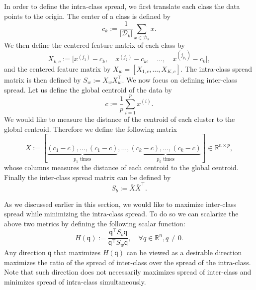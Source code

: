 \documentclass[11pt]{article}
\newcommand{\R}{\mathbb{R}}
\newcommand{\D}{\mathcal{D}}
\newcommand{\q}{\textsf{q}}
\begin{document}
In order to define the intra-class spread, we first translate each
class the data points to the origin. The center of a class is defined
by
\begin{equation}
  c_k := \frac{1}{|\D_k|} \sum_{x \in \D_k} x.
\end{equation}
We then define the centered feature matrix of each class by
\begin{equation}
  X_{k, c} := \Big[x^{(j_1)}-c_k, \quad x^{(j_2)}-c_k, \quad \dots,
    \quad x^{(j_{p_k})}-c_k \Big],
\end{equation}
and the centered feature matrix by $X_w = [X_{1, c}, \dots, X_{K,
    c}]$.  The intra-class spread matrix is then defined by $S_w :=
X_w^{} X_w^{\top}$. We now focus on defining inter-class spread. Let
us define the global centroid of the data by
\begin{equation}
	c := \frac{1}{p} \sum_{i=1}^{p} x^{(i)}.
\end{equation}
We would like to measure the distance of the centroid of each cluster
to the global centroid. Therefore we define the following matrix
\begin{equation}
	\bar{X} := [ \underbrace{(c_1 - c), \dots, (c_1 - c)}_{p_1
            \text{ times}}, \dots, \underbrace{(c_k - c), \dots, (c_k
            - c)}_{p_k \text{ times}}] \in \R^{n \times p},
\end{equation}
whose columns measures the distance of each centroid to the global
centroid. Finally the inter-class spread matrix can be defined by
\begin{equation}
	S_b := \bar{X} \bar{X}^{\top}.
\end{equation}

As we discussed earlier in this section, we would like to maximize
inter-class spread while minimizing the intra-class spread. To do so
we can scalarize the above two metrics by defining the following
scalar function:
\begin{equation}
	H(\q) := \frac{ \q^{\top}_{} S_{b}^{} \q }{\q^{\top}_{}
          S_{w}^{} \q}, \quad \forall q \in \R^{n}, q \not = 0.
\end{equation}
Any direction $\q$ that maximizes $H(\q)$ can be viewed as a desirable
direction maximizes the ratio of the spread of inter-class over the
spread of the intra-class. Note that such direction does not
necessarily maximizes spread of inter-class and minimizes spread of
intra-class simultaneously.
\end{document}
